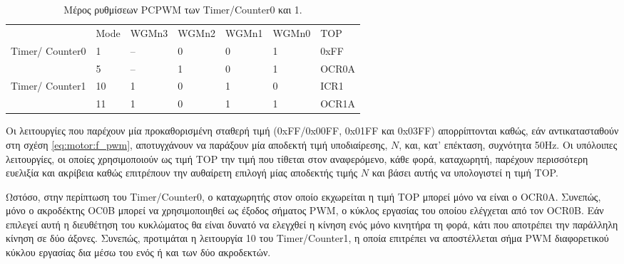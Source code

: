 \begin{table}
    \caption{Μέρος ρυθμίσεων PCPWM των \textenglish{Timer\slash Counter0} και 1.
        \label{tab:motor:wgm}}

\begin{center}
\begin{tabu} spread 0pt
    {X[-1,C] X[-1,C] X[-1,C] X[-1,C] X[-1,C] X[-1,C] X[-1]}

    \rowfont\bfseries
                    & {Mode} & {WGMn3} & {WGMn2} & {WGMn1} & {WGMn0} & {TOP}  \\
    Timer\slash
    Counter0        &      1 &      -- &       0 &       0 &       1 &  0xFF  \\
                    &      5 &      -- &       1 &       0 &       1 & OCR0A  \\
    Timer\slash
    Counter1        &     10 &       1 &       0 &       1 &       0 &  ICR1  \\
                    &     11 &       1 &       0 &       1 &       1 & OCR1A  \\
\end{tabu}

\end{center}\end{table}

Οι λειτουργίες που παρέχουν μία προκαθορισμένη σταθερή τιμή (0xFF\slash 0x00FF,
0x01FF και 0x03FF) απορρίπτονται καθώς, εάν αντικατασταθούν στη σχέση
\eqref{eq:motor:f_pwm}, αποτυγχάνουν να παράξουν μία αποδεκτή τιμή υποδιαίρεσης,
$N$, και, κατ' επέκταση, συχνότητα 50Hz. Οι υπόλοιπες λειτουργίες, οι οποίες
χρησιμοποιούν ως τιμή TOP την τιμή που τίθεται στον αναφερόμενο, κάθε φορά,
καταχωρητή, παρέχουν περισσότερη ευελιξία και ακρίβεια καθώς επιτρέπουν την
αυθαίρετη επιλογή μίας αποδεκτής τιμής $N$ και βάσει αυτής να υπολογιστεί η τιμή
TOP.

Ωστόσο, στην περίπτωση του \textenglish{Timer\slash Counter0}, ο καταχωρητής
στον οποίο εκχωρείται η τιμή TOP μπορεί μόνο να είναι ο OCR0A. Συνεπώς, μόνο ο
ακροδέκτης OC0B μπορεί να χρησιμοποιηθεί ως έξοδος σήματος PWM, ο κύκλος
εργασίας του οποίου ελέγχεται από τον OCR0B. Εάν επιλεγεί αυτή η διευθέτηση του
κυκλώματος θα είναι δυνατό να ελεγχθεί η κίνηση ενός μόνο κινητήρα τη φορά,
κάτι που αποτρέπει την παράλληλη κίνηση σε δύο άξονες. Συνεπώς, προτιμάται η
λειτουργία 10 του \textenglish{Timer\slash Counter1}, η οποία επιτρέπει να
αποστέλλεται σήμα PWM διαφορετικού κύκλου εργασίας δια μέσω του ενός ή και των
δύο ακροδεκτών.


